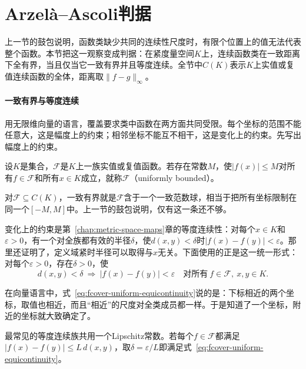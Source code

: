 \section{Arzelà--Ascoli判据}
\label{sec:fcover-arzela-ascoli}

上一节的鼓包说明，函数类缺少共同的连续性尺度时，有限个位置上的值无法代表整个函数。本节把这一观察变成判据：在紧度量空间$K$上，连续函数类在一致距离下全有界，当且仅当它一致有界并且等度连续。全节中$C(K)$表示$K$上实值或复值连续函数的全体，距离取$\lVert f-g\rVert_\infty$。

\paragraph{一致有界与等度连续}

用无限维向量的语言，覆盖要求类中函数在两方面共同受限。每个坐标的范围不能任意大，这是幅度上的约束；相邻坐标不能互不相干，这是变化上的约束。先写出幅度上的约束。

\begin{definition}[一致有界]
\label{def:fcover-uniformly-bounded}
设$K$是集合，$\mathcal F$是$K$上一族实值或复值函数。若存在常数$M$，使$\lvert f(x)\rvert\leq M$对所有$f\in\mathcal F$和所有$x\in K$成立，就称$\mathcal F$（uniformly bounded）。
\end{definition}

对$\mathcal F\subseteq C(K)$，一致有界就是$\mathcal F$含于一个一致范数球，相当于把所有坐标限制在同一个$[-M,M]$中。上一节的鼓包说明，仅有这一条还不够。

变化上的约束是第~\ref{chap:metric-space-maps}章的等度连续性：对每个$x\in K$和$\varepsilon>0$，有一个对全族都有效的半径$\delta$，使$d(x,y)<\delta$时$\lvert f(x)-f(y)\rvert<\varepsilon$。那里还证明了，定义域紧时半径可以取得与$x$无关。下面使用的正是这一统一形式：对每个$\varepsilon>0$，存在$\delta>0$，使
\begin{equation}
 d(x,y)<\delta\ \Longrightarrow\ \lvert f(x)-f(y)\rvert<\varepsilon
 \quad\text{对所有}\ f\in\mathcal F,\ x,y\in K .
 \label{eq:fcover-uniform-equicontinuity}
\end{equation}

在向量语言中，式~\eqref{eq:fcover-uniform-equicontinuity}说的是：下标相近的两个坐标，取值也相近，而且“相近”的尺度对全类成员都一样。于是知道了一个坐标，附近的坐标就大致确定了。

最常见的等度连续族共用一个Lipschitz常数。若每个$f\in\mathcal F$都满足$\lvert f(x)-f(y)\rvert\leq L\,d(x,y)$，取$\delta=\varepsilon/L$即满足式~\eqref{eq:fcover-uniform-equicontinuity}。


